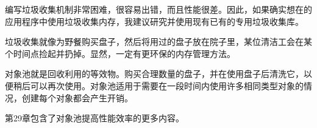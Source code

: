 编写垃圾收集机制非常困难，很容易出错，而且性能很差。因此，如果确实想在的应用程序中使用垃圾收集内存，我建议研究并使用现有已有的专用垃圾收集库。


垃圾收集就像为野餐购买盘子，然后将用过的盘子放在院子里，某位清洁工会在某个时间点捡起并扔掉。显然，一定有更环保的内存管理方法。

对象池就是回收利用的等效物。购买合理数量的盘子，并在使用盘子后清洗它，以便稍后可以再次使用。对象池适用于需要在一段时间内使用许多相同类型对象的情况，创建每个对象都会产生开销。

第29章包含了对象池提高性能效率的更多内容。















